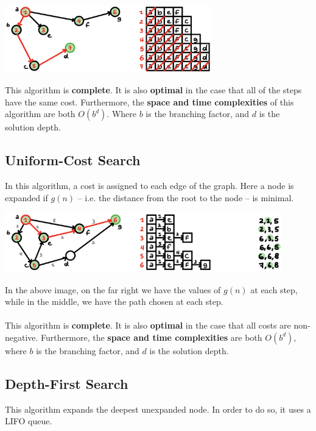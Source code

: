 \documentclass{article}
\begin{document}
\begin{center}
	\includegraphics[width=9cm]{bfs.png}
\end{center}
\vspace{.3cm}
This algorithm is \textbf{complete}. It is also \textbf{optimal} in the case that all of the steps have the same cost. Furthermore, the \textbf{space and time complexities} of this algorithm are both $O(b^d)$. Where $b$ is the branching factor, and $d$ is the solution depth.

\subsection{Uniform-Cost Search}
In this algorithm, a cost is assigned to each edge of the graph. Here a node is expanded if $g(n)$ -- i.e. the distance from the root to the node -- is minimal. \\

\begin{center}
	\includegraphics[width=12cm]{ucs.png}
\end{center}
\vspace{.3cm}
In the above image, on the far right we have the values of $g(n)$ at each step, while in the middle, we have the path chosen at each step. \\ \\
This algorithm is \textbf{complete}. It is also \textbf{optimal} in the case that all costs are non-negative. Furthermore, the \textbf{space and time complexities} are both $O(b^d)$, where $b$ is the branching factor, and $d$ is the solution depth.

\subsection{Depth-First Search}
This algorithm expands the deepest unexpanded node. In order to do so, it uses a LIFO queue. \\
\end{document}
